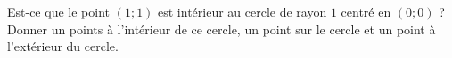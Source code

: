 
\begin{exercice}\label{exoSeconde-0009}

    Est-ce que le point \( (1;1)\) est intérieur au cercle de rayon \( 1\) centré en \( (0;0)\) ? Donner un points à l'intérieur de ce cercle, un point sur le cercle et un point à l'extérieur du cercle.

\end{exercice}
